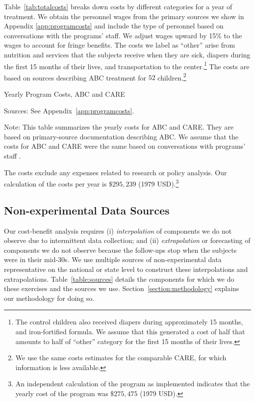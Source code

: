 Table~\ref{tab:totalcosts} breaks down costs by different categories for a year of treatment. We obtain the personnel wages from the primary sources we show in Appendix \ref{app:programcosts} and include the type of personnel based on conversations with the programs' staff. We adjust wages upward by 15\% to the wages to account for fringe benefits. The costs we label as ``other'' arise from nutrition and services that the subjects receive when they are sick, diapers during the first 15 months of their lives, and transportation to the center.\footnote{The control children also received diapers during approximately 15 months, and iron-fortified formula. We assume that this generated a cost of half that amounts to half of ``other'' category for the first 15 months of their lives.} The costs are based on sources describing ABC treatment for $52$ children.\footnote{We use the same costs estimates for the comparable CARE, for which information is less available.}

\begin{table}[H]
\begin{threeparttable}
\caption{Yearly Program Costs, ABC and CARE} \label{tab:totalcosts}
\footnotesize

\begin{tablenotes}
\footnotesize
\item Sources: See Appendix~\ref{app:programcosts}.\\
\item Note: This table summarizes the yearly costs for ABC and CARE. They are based on primary-source documentation describing ABC. We assume that the costs for ABC and CARE were the same based on conversations with programs' staff \citet{projectcare2014interviews,abc2014-2015interviews}.
\end{tablenotes}
\end{threeparttable}
\end{table}

The costs exclude any expenses related to research or policy analysis. Our calculation of the costs per year is $\$295,239$ (1979 USD).\footnote{An independent calculation of the program as implemented indicates that the yearly cost of the program was $\$275,475$  (1979 USD).}

\subsection{Non-experimental Data Sources}

Our cost-benefit analysis requires (i) \textit{interpolation} of components we do not observe due to intermittent data collection; and (ii) \textit{extrapolation} or forecasting of components we do not observe because the follow-ups stop when the subjects were in their mid-30s. We use multiple sources of non-experimental data representative on the national or state level to construct these interpolations and extrapolations. Table~\ref{table:sources} details the components for which we do these exercises and the sources we use. Section~\ref{section:methodology} explains our methodology for doing so.

